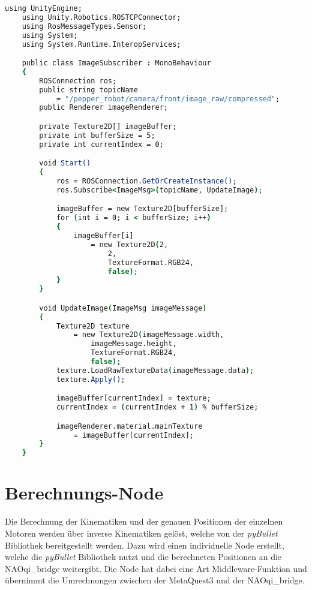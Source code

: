 \begin{lstlisting}[language=csh, caption=Abgreifen der Kamerabilder, label=lst:unity-image-data]
    using UnityEngine;
    using Unity.Robotics.ROSTCPConnector;
    using RosMessageTypes.Sensor;
    using System;
    using System.Runtime.InteropServices;

    public class ImageSubscriber : MonoBehaviour
    {
        ROSConnection ros;
        public string topicName
            = "/pepper_robot/camera/front/image_raw/compressed";
        public Renderer imageRenderer;

        private Texture2D[] imageBuffer;
        private int bufferSize = 5;
        private int currentIndex = 0;

        void Start()
        {
            ros = ROSConnection.GetOrCreateInstance();
            ros.Subscribe<ImageMsg>(topicName, UpdateImage);

            imageBuffer = new Texture2D[bufferSize];
            for (int i = 0; i < bufferSize; i++)
            {
                imageBuffer[i]
                    = new Texture2D(2,
                        2,
                        TextureFormat.RGB24,
                        false);
            }
        }

        void UpdateImage(ImageMsg imageMessage)
        {
            Texture2D texture
                = new Texture2D(imageMessage.width,
                    imageMessage.height,
                    TextureFormat.RGB24,
                    false);
            texture.LoadRawTextureData(imageMessage.data);
            texture.Apply();

            imageBuffer[currentIndex] = texture;
            currentIndex = (currentIndex + 1) % bufferSize;

            imageRenderer.material.mainTexture
                = imageBuffer[currentIndex];
        }
    }
\end{lstlisting}


\section{Berechnungs-Node}\label{sec:Berechnungs-Node}

Die Berechnung der Kinematiken und der genauen Positionen der einzelnen Motoren werden über inverse Kinematiken gelöst, welche von der \textit{pyBullet} Bibliothek bereitgestellt werden. Dazu wird einen individuelle Node erstellt, welche die \textit{pyBullet} Bibliothek nutzt und die berechneten Positionen an die NAOqi\_bridge weitergibt. Die Node hat dabei eine Art Middleware-Funktion und übernimmt die Umrechnungen zwischen der MetaQuest3 und der NAOqi\_bridge.
\\

